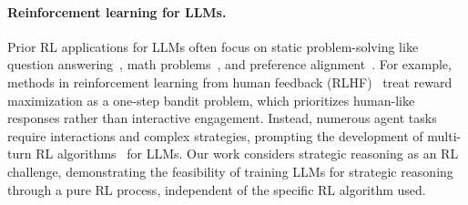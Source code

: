 \paragraph{\textbf{Reinforcement learning for LLMs.}}
Prior RL applications for LLMs often focus on static problem-solving like question answering~\cite{10.5555/3491440.3491941, suzgun-etal-2023-challenging}, math problems~\cite{lightman2024lets, kumar2024training}, and preference alignment~\cite{christiano2017deep, guan2024deliberative}.
For example, methods in reinforcement learning from human feedback (RLHF)~\cite{ouyang2022training, gulcehre2023reinforced, rafailov2024direct} treat reward maximization as a one-step bandit problem, which prioritizes human-like responses rather than interactive engagement.
Instead, numerous agent tasks require interactions and complex strategies, prompting the development of multi-turn RL algorithms~\cite{pmlr-v235-zhou24t, shani2024multiturn} for LLMs. 
Our work considers strategic reasoning as an RL challenge, demonstrating the feasibility of training LLMs for strategic reasoning through a pure RL process, independent of the specific RL algorithm used.


